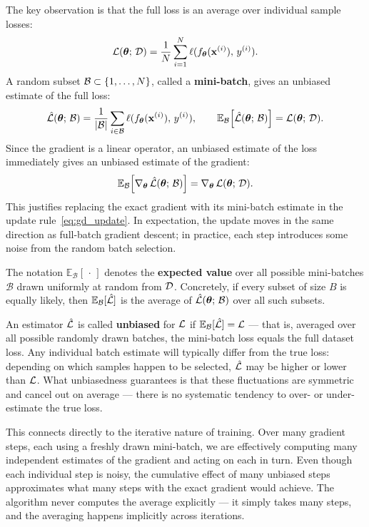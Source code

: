 The key observation is that the full loss is an average over individual sample losses:
\begin{equation}
    \mathcal{L}(\boldsymbol{\theta};\, \mathcal{D}) = \frac{1}{N} \sum_{i=1}^{N} \ell(f_{\boldsymbol{\theta}}(\mathbf{x}^{(i)}),\, y^{(i)}).
\end{equation}
A random subset $\mathcal{B} \subset \{1,\ldots,N\}$, called a \textbf{mini-batch}, gives an unbiased estimate of the full loss:
\begin{equation}
    \hat{\mathcal{L}}(\boldsymbol{\theta};\, \mathcal{B}) = \frac{1}{|\mathcal{B}|} \sum_{i \in \mathcal{B}} \ell(f_{\boldsymbol{\theta}}(\mathbf{x}^{(i)}),\, y^{(i)}),
    \qquad \mathbb{E}_{\mathcal{B}}\!\left[\hat{\mathcal{L}}(\boldsymbol{\theta};\,\mathcal{B})\right] = \mathcal{L}(\boldsymbol{\theta};\,\mathcal{D}).
\end{equation}
Since the gradient is a linear operator, an unbiased estimate of the loss immediately gives an unbiased estimate of the gradient:
\begin{equation}
    \mathbb{E}_{\mathcal{B}}\!\left[\nabla_{\boldsymbol{\theta}}\,\hat{\mathcal{L}}(\boldsymbol{\theta};\,\mathcal{B})\right] = \nabla_{\boldsymbol{\theta}}\,\mathcal{L}(\boldsymbol{\theta};\,\mathcal{D}).
\end{equation}
This justifies replacing the exact gradient with its mini-batch estimate in the update rule~\eqref{eq:gd_update}. In expectation, the update moves in the same direction as full-batch gradient descent; in practice, each step introduces some noise from the random batch selection.

\begin{remark}
The notation $\mathbb{E}_{\mathcal{B}}[\,\cdot\,]$ denotes the \textbf{expected value} over all possible mini-batches $\mathcal{B}$ drawn uniformly at random from $\mathcal{D}$. Concretely, if every subset of size $B$ is equally likely, then $\mathbb{E}_{\mathcal{B}}[\hat{\mathcal{L}}]$ is the average of $\hat{\mathcal{L}}(\boldsymbol{\theta};\,\mathcal{B})$ over all such subsets.

An estimator $\hat{\mathcal{L}}$ is called \textbf{unbiased} for $\mathcal{L}$ if $\mathbb{E}_{\mathcal{B}}[\hat{\mathcal{L}}] = \mathcal{L}$ — that is, averaged over all possible randomly drawn batches, the mini-batch loss equals the full dataset loss. Any individual batch estimate will typically differ from the true loss: depending on which samples happen to be selected, $\hat{\mathcal{L}}$ may be higher or lower than $\mathcal{L}$. What unbiasedness guarantees is that these fluctuations are symmetric and cancel out on average — there is no systematic tendency to over- or under-estimate the true loss.

This connects directly to the iterative nature of training. Over many gradient steps, each using a freshly drawn mini-batch, we are effectively computing many independent estimates of the gradient and acting on each in turn. Even though each individual step is noisy, the cumulative effect of many unbiased steps approximates what many steps with the exact gradient would achieve. The algorithm never computes the average explicitly — it simply takes many steps, and the averaging happens implicitly across iterations.
\end{remark}

